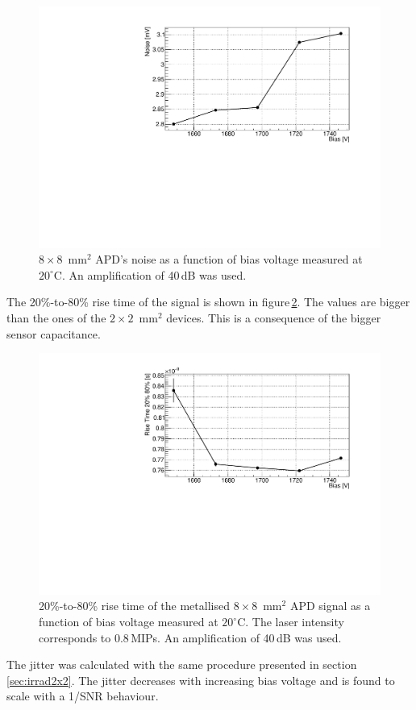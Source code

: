 \documentclass[review,number,sort&compress]{elsarticle}
\begin{document}
\begin{figure}
  \centering
  \includegraphics[width = 0.6 \columnwidth]{noise8x8metal}
  \caption{$8 \times 8$~mm$^2$ APD's noise as a function of bias voltage measured at $20^\circ$C. An amplification of 40\,dB was used.}
  \label{fig:noise8x8metal}
\end{figure}

The 20\%-to-80\% rise time of the signal is shown in figure\,\ref{fig:riseTime8x8metal}.
The values are bigger than the ones of the $2 \times 2$~mm$^2$ devices.
This is a consequence of the bigger sensor capacitance.

\begin{figure}
  \centering
  \includegraphics[width = 0.6 \columnwidth]{riseTime8x8metal}
  \caption{20\%-to-80\% rise time of the metallised $8 \times 8$~mm$^2$ APD signal as a function of bias voltage measured at $20^\circ$C. The laser intensity corresponds to 0.8\,MIPs. An amplification of 40\,dB was used.}
  \label{fig:riseTime8x8metal}
\end{figure}

The jitter was calculated with the same procedure presented in section\,\ref{sec:irrad2x2}.
The jitter decreases with increasing bias voltage and is found to scale with a 1/SNR behaviour.
\end{document}
